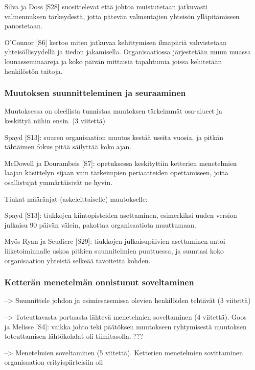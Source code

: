Silva ja Doss [S28] suosittelevat että johtoa muistutetaan jatkuvasti
valmennuksen tärkeydestä, jotta pätevän valmentajien yhteisön ylläpitämiseen
panostetaan.

O'Connor [S6] kertoo miten jatkuvaa kehittymisen ilmapiiriä vahvistetaan
yhteisöllisyydellä ja tiedon jakamisella. Organisaatiossa järjestetään muun
muassa lounasseminaareja ja koko päivän mittaisia tapahtumia joissa kehitetään
henkilöstön taitoja.



\subsubsection{Muutoksen suunnitteleminen ja seuraaminen}

Muutoksessa on oleellista tunnistaa muutoksen tärkeimmät osa-alueet ja keskittyä
niihin ensin. (3 viitettä)

Spayd [S13]: suuren organisaation muutos kestää useita vuosia, ja pitkän
tähtäimen fokus pitää säilyttää koko ajan.

McDowell ja Dourambeis [S7]: opetuksessa keskityttiin ketterien menetelmien
laajan käsittelyn sijaan vain tärkeimpien periaatteiden opettamiseen, jotta
osallistujat ymmärtäisivät ne hyvin.

Tiukat määräajat (askeleittaiselle) muutokselle:

Spayd [S13]: tiukkojen kiintopisteiden asettaminen, esimerkiksi uuden version
julkaisu 90 päivän välein, pakottaa organisaatiota muuttumaan.

Myös Ryan ja Scudiere [S29]: tiukkojen julkaisupäivien asettaminen antoi
liiketoiminnalle uskoa pitkien suunnitelmien puuttuessa, ja suuntasi koko
organisaation yhteistä selkeää tavoitetta kohden.

\subsubsection{Ketterän menetelmän onnistunut soveltaminen}

--> Suunnittele johdon ja esimiesasemissa olevien henkilöiden tehtävät
(3 viitettä)

--> Toteuttavasta portaasta lähtevä menetelmien soveltaminen (4 viitettä).
Goos ja Melisse [S4]: vaikka johto teki päätöksen muutokseen ryhtymisestä
muutoksen toteuttamisen lähtökohdat oli tiimitasolla. ???


--> Menetelmien soveltaminen (5 viitettä).
Ketterien menetelmien sovittaminen organisaation erityispiirteisiin oli 

